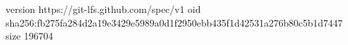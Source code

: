 version https://git-lfs.github.com/spec/v1
oid sha256:fb275fa284d2a19e3429e5989a0d1f2950ebb435f1d42531a276b80c5b1d7447
size 196704
